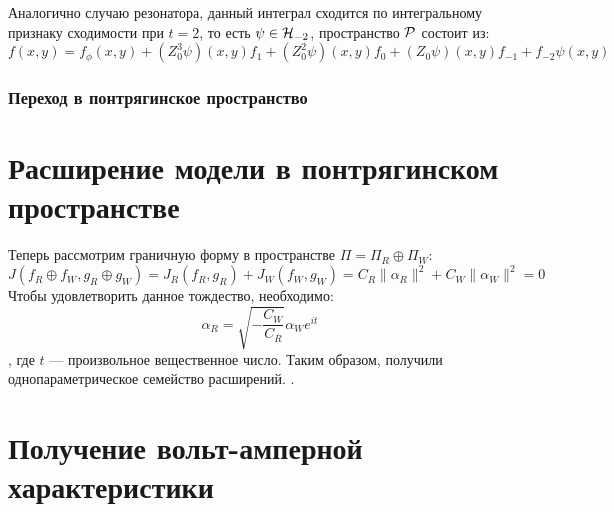 Аналогично случаю резонатора, данный интеграл сходится по интегральному признаку сходимости при $t = 2$, то есть $\psi \in \mathcal{H}_{-2}$, пространство $\mathcal{P}$ состоит из:
\[
f(x, y) = f_\phi(x, y) + (Z_0^3 \psi)(x, y) f_1 + (Z_0^2 \psi)(x, y) f_0 + (Z_0 \psi)(x, y) f_{-1} + f_{-2} \psi(x, y)
\]


\subsubsection{Переход в понтрягинское пространство}


\section{Расширение модели в понтрягинском пространстве}
Теперь рассмотрим граничную форму в пространстве $\Pi = \Pi_R \oplus \Pi_W$:
\[
J(f_R \oplus f_W, g_R \oplus g_W) = J_R(f_R, g_R) + J_W(f_W, g_W) = C_R \|\alpha_R\|^2 + C_W \|\alpha_W\|^2 = 0
\]
Чтобы удовлетворить данное тождество, необходимо:
\[
\alpha_R = \sqrt{-\frac{C_W}{C_R}} \alpha_W e^{i t}
\]
, где $t$ — произвольное вещественное число. Таким образом, получили однопараметрическое семейство расширений. .


\section{Получение вольт-амперной характеристики}

